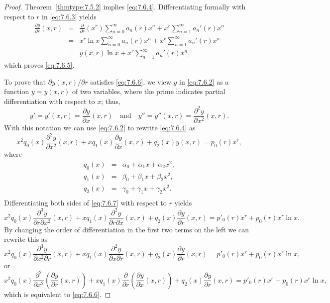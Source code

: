 \documentclass{ximera}
\begin{document}
\begin{proof}
Theorem~\ref{thmtype:7.5.2} implies \eqref{eq:7.6.4}. Differentiating
formally
with respect to $r$ in \eqref{eq:7.6.3} yields
\begin{eqnarray*}
\frac{\partial y}{\partial r} (x,r)&=&\frac{\partial}{\partial r}(x^r)\sum_{n=0}^\infty
a_n(r)x^n +x^r\sum_{n=1}^\infty  a_n'(r)x^n\\
&=&x^r\ln x\sum_{n=0}^\infty
a_n(r)x^n +x^r\sum_{n=1}^\infty  a_n'(r)x^n\\
&=&y(x,r) \ln x +
x^r\sum_{n=1}^\infty  a_n'(r)x^n,
\end{eqnarray*}
which proves \eqref{eq:7.6.5}.

To prove that  $\partial y(x,r)/\partial r$ satisfies \eqref{eq:7.6.6}, we
view $y$ in \eqref{eq:7.6.2} as a function $y=y(x,r)$  of two
variables, where the prime indicates partial differentiation with
respect to $x$;   thus,
$$
y'=y'(x,r)=\frac{\partial y}{\partial x}(x,r)\quad\mbox{and}\quad
y''=y''(x,r)=\frac{\partial^2 y}{\partial x^2}(x,r).
$$
With this notation we can use \eqref{eq:7.6.2} to rewrite \eqref{eq:7.6.4} as
\begin{equation} \label{eq:7.6.7}
x^2q_0(x)\frac{\partial^2 y}{\partial x^2}(x,r)+xq_1(x)\frac{\partial y}{\partial x}(x,r)+q_2(x)y(x,r)=p_0(r)x^r,
\end{equation}
where
\begin{eqnarray*}
q_0(x)&=&\alpha_0+\alpha_1x+\alpha_2x^2,\\
q_1(x)&=&\beta_0+\beta_1x+\beta_2x^2,\\
q_2(x)&=&\gamma_0+\gamma_1x+\gamma_2x^2.\\
\end{eqnarray*}
Differentiating both sides of \eqref{eq:7.6.7} with respect to $r$
yields
$$
x^2q_0(x)\frac{\partial^3y}{\partial r\partial x^2}(x,r)+
xq_1(x)\frac{\partial^2y}{\partial r\partial x}(x,r)+q_2(x)\frac{\partial
y}{\partial r}(x,r)=p'_0(r)x^r+p_0(r) x^r \ln x.
$$
By changing the order of differentiation in the first two terms on the left
we can rewrite this  as
$$
x^2q_0(x)\frac{\partial^3 y}{\partial x^2\partial r}(x,r)
+xq_1(x)\frac{\partial^2 y}{\partial x\partial r}(x,r)+q_2(x)\frac{\partial
y}{\partial r}(x,r)=p'_0(r)x^r+p_0(r) x^r \ln x,
$$
or
$$
x^2q_0(x)\frac{\partial^2}{\partial x^2}
\left(\frac{\partial y}{\partial r}(x,r)\right)
+xq_1(x)\frac{\partial}{\partial r}\left(\frac{\partial y}{\partial
x}(x,r)\right) +q_2(x)\frac{\partial y}{\partial r}(x,r)=
p'_0(r)x^r+p_0(r) x^r \ln x,
$$
which is equivalent to \eqref{eq:7.6.6}.
\end{proof}
\end{document}
